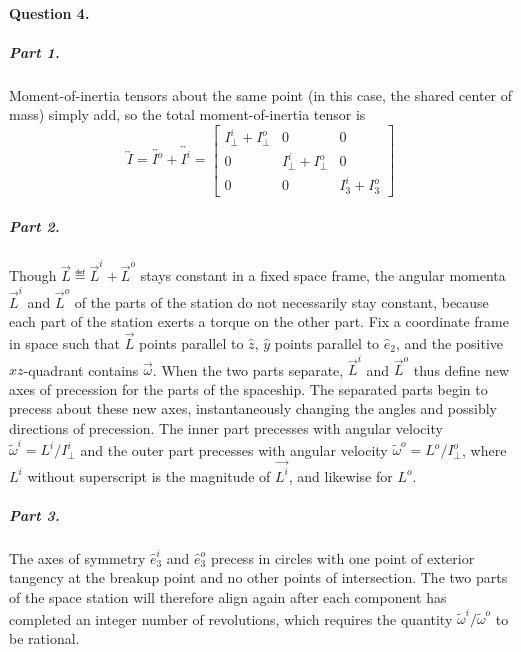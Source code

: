 \paragraph{Question 4.}

\subparagraph{Part 1.}  Moment-of-inertia tensors about the same point (in this case, the shared center of mass) simply add, so the total moment-of-inertia tensor is $$\overleftrightarrow{I}
= \overleftrightarrow{I^o} + \overleftrightarrow{I^i} =
\begin{bmatrix}
I_\bot^i + I_\bot^o & 0 & 0 \\
0 & I_\bot^i + I_\bot^o & 0 \\
0 & 0 & I_3^i + I_3^o
\end{bmatrix}$$

\subparagraph{Part 2.}

Though $\vec{L} \eqdef \vec{L}^i + \vec{L}^o$ stays constant in a fixed space frame, the angular momenta $\vec{L}^i$ and $\vec{L}^o$ of the parts of the station do not necessarily stay constant, because each part of the station exerts a torque on the other part.  Fix a coordinate frame in space such that $\vec{L}$ points parallel to $\hat{z}$, $\hat{y}$ points parallel to $\hat{e}_2$, and the positive $xz$-quadrant contains $\vec{\omega}$. When the two parts separate, $\vec{L}^i$ and $\vec{L}^o$ thus define new axes of precession for the parts of the spaceship.  The separated parts begin to precess about these new axes, instantaneously changing the angles and possibly directions of precession.  The inner part precesses with angular velocity $\tilde{\omega}^i = L^i/I_\bot^i$ and the outer part precesses with angular velocity $\tilde{\omega}^o = L^o/I_{\bot}^o$, where $L^i$ without superscript is the magnitude of $\vec{L^i}$, and likewise for $L^o$.

\subparagraph{Part 3.}

The axes of symmetry $\hat{e}_3^i$ and $\hat{e}_3^o$ precess in circles with one point of exterior tangency at the breakup point and no other points of intersection.  The two parts of the space station will therefore align again after each component has completed an integer number of revolutions, which requires the quantity $\tilde{\omega}^i / \tilde{\omega}^o$ to be rational.

